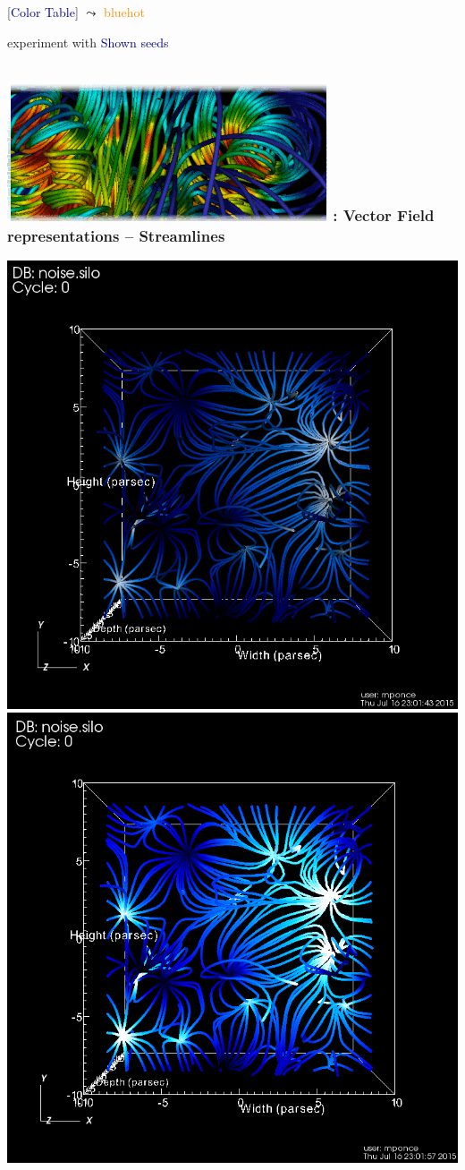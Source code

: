 \begin{frame}
\begin{columns}
\begin{column}{11cm}
\begin{beamerboxesrounded}[upper=block head,lower=block body,shadow=true]{}
	\pause
	\hspace{3.5mm}
		[\textcolor{DarkBlue}{Color Table}] $\leadsto$ \textcolor{DarkOrange}{bluehot}
	 
	\end{beamerboxesrounded}

	\pause
	\begin{beamerboxesrounded}[upper=block head,lower=block body,shadow=true]{}
	\hspace{3.5mm}
		experiment with \textcolor{DarkBlue}{Shown seeds}
\end{beamerboxesrounded}
\end{column}
\begin{column}{2cm}
\end{column}
\end{columns}
\end{frame}


\begin{frame}
\frametitle{\href{https://wci.llnl.gov/simulation/computer-codes/visit/}{\includegraphics[height=.85cm]{figs/visit-logos/VisIt-01}} \hspace{-.85cm}{\bf \textcolor{lightgray}{VisIt}}: Vector Field representations -- {Streamlines}}
	\centering
	\includegraphics[width=0.45\columnwidth]{figs/visit-pract/VisIt_streamlines-01b}
	\includegraphics[width=0.45\columnwidth]{figs/visit-pract/VisIt_streamlines-01c}

\end{frame}




